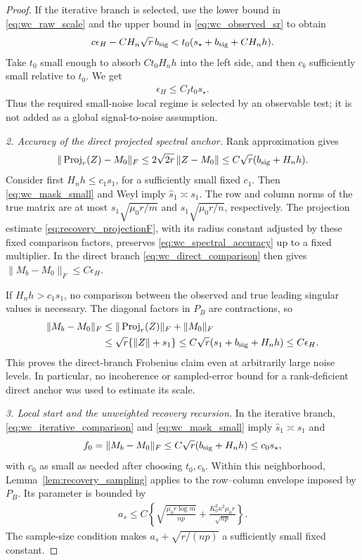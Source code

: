 \documentclass[numsec,webpdf,modern,large,namedate]{oup-authoring-template}
\theoremstyle{plain}
\theoremstyle{remark}
\newif\ifmarkchanges
\newenvironment{revision}{\begingroup\ifmarkchanges\color{red}\fi}{\endgroup}
\begin{document}
\begin{revision}
\begin{proof}
If the iterative branch is selected, use the lower bound in
\eqref{eq:wc_raw_scale} and the upper bound in
\eqref{eq:wc_observed_sr} to obtain
\[
 c\epsilon_H-CH_n\sqrt r\,b_{\rm sig}
 <t_0(s_\star+b_{\rm sig}+CH_nh).
\]
Take $t_0$ small enough to absorb $Ct_0H_nh$ into the left side, and then
$c_b$ sufficiently small relative to $t_0$. We get
\begin{align}
 \epsilon_H\le C_It_0s_\star.
 \label{eq:wc_iterative_comparison}
\end{align}
Thus the required small-noise local regime is selected by an observable
test; it is not added as a global signal-to-noise assumption.

\textit{2. Accuracy of the direct projected spectral anchor.}
Rank approximation gives
\begin{align}
 \|\operatorname{Proj}_r(Z)-M_0\|_F
 \le 2\sqrt{2r}\,\|Z-M_0\|
 \le C\sqrt r(b_{\rm sig}+H_nh).
 \label{eq:wc_spectral_accuracy}
\end{align}
Consider first $H_nh\le c_1s_1$, for a sufficiently small fixed $c_1$.
Then \eqref{eq:wc_mask_small} and Weyl imply
$\widehat s_1\asymp s_1$. The row and column norms of the true matrix
are at most $s_1\sqrt{\mu_0r/m}$ and
$s_1\sqrt{\mu_0r/n}$, respectively. The projection estimate
\eqref{eq:recovery_projectionF}, with its radius constant adjusted by
these fixed comparison factors, preserves
\eqref{eq:wc_spectral_accuracy} up to a fixed multiplier. In the direct
branch \eqref{eq:wc_direct_comparison} then gives
$\|M_b-M_0\|_F\le C\epsilon_H$.

If $H_nh>c_1s_1$, no comparison between the observed and true leading
singular values is necessary. The diagonal factors in $P_B$ are
contractions, so
\begin{align*}
 \|M_b-M_0\|_F
 &\le\|\operatorname{Proj}_r(Z)\|_F+\|M_0\|_F\\
 &\le\sqrt r\{\|Z\|+s_1\}
 \le C\sqrt r(s_1+b_{\rm sig}+H_nh)
 \le C\epsilon_H.
\end{align*}
This proves the direct-branch Frobenius claim even at arbitrarily large
noise levels. In particular, no incoherence or sampled-error bound for a
rank-deficient direct anchor was used to estimate its scale.

\textit{3. Local start and the unweighted recovery recursion.}
In the iterative branch, \eqref{eq:wc_iterative_comparison} and
\eqref{eq:wc_mask_small} imply $\widehat s_1\asymp s_1$ and
\[
 f_0=\|M_b-M_0\|_F\le
 C\sqrt r(b_{\rm sig}+H_nh)\le c_0s_\star,
\]
with $c_0$ as small as needed after choosing $t_0,c_b$.
Within this neighborhood, Lemma~\ref{lem:recovery_sampling} applies to
the row--column envelope imposed by $P_B$. Its parameter is bounded by
\begin{align}
 a_s\le C\left\{
 \sqrt{\frac{\mu_0r\log m}{np}}+
 \frac{K_0^2\kappa^2\mu_0r}{\sqrt{np}}\right\}.
 \label{eq:wc_sampling_constant}
\end{align}
The sample-size condition makes $a_s+\sqrt{r/(np)}$ a sufficiently small
fixed constant.


\end{proof}
\end{revision}
\end{document}
